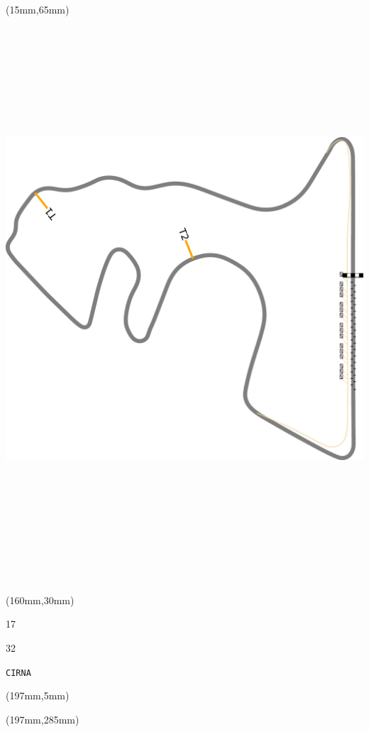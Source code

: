 \begin{textblock*}{185mm}(15mm,65mm)%
\centering
\mbox{\includegraphics[width=185mm,height=210mm,keepaspectratio]{PT/CIRNA.pdf}}
\end{textblock*}
\begin{textblock*}{40mm}(160mm,30mm)%
\Large
\par{} 
\par17 
\par32 
\par\hfill\tiny\tt CIRNA\\
\end{textblock*}
\begin{textblock*}{20mm}(197mm,5mm)%
\fbox{\thepage}
\label{CIRNA}
\end{textblock*}
\begin{textblock*}{20mm}(197mm,285mm)%
\fbox{\thepage}
\end{textblock*}

